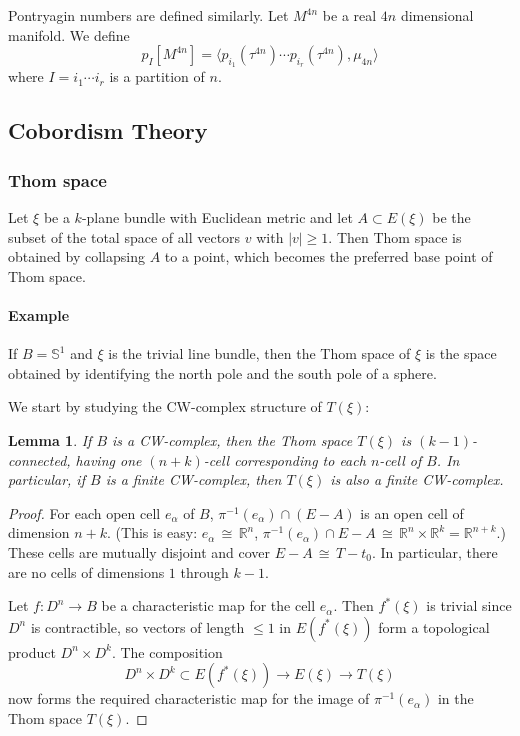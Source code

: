 \documentclass[12pt]{article}
\theoremstyle{plain}
\newtheorem{lemma}[equation]{Lemma}
\theoremstyle{definition}
\newcommand{\IR}{\mathbb{R}}
\newcommand{\IS}{\mathbb{S}}
\newcommand\iso{\,{\cong}\,}
\newcommand{\<}{\langle}
\renewcommand{\>}{\rangle}
\begin{document}
Pontryagin numbers are defined similarly. Let $M^{4n}$ be a real $4n$ dimensional manifold. We define 
$$ p_I[M^{4n}] = \< p_{i_1}(\tau^{4n}) \cdots p_{i_r}(\tau^{4n}), \mu_{4n} \> $$
where $I = i_1 \cdots i_r$ is a partition of $n$. 

\subsection{Cobordism Theory} 
\subsubsection{Thom space}
Let $\xi$ be a $k$-plane bundle with Euclidean metric and let $A \subset E(\xi)$ be the subset of the total space of all vectors $v$ with $|v| \ge 1$. Then Thom space is obtained by collapsing $A$ to a point, which becomes the preferred base point of Thom space. 

\paragraph{Example} If $B = \IS^1$ and $\xi$ is the trivial line bundle, then the Thom space of $\xi$ is the space obtained by identifying the north pole and the south pole of a sphere. 

We start by studying the CW-complex structure of $T(\xi)$: 
\begin{lemma}
If $B$ is a CW-complex, then the Thom space $T(\xi)$ is $(k - 1)$-connected, having one $(n + k)$-cell corresponding to each $n$-cell of $B$. In particular, if $B$ is a finite CW-complex, then $T(\xi)$ is also a finite CW-complex. 
\end{lemma}
\begin{proof}
For each open cell $e_\alpha$ of $B$, $\pi^{-1}(e_\alpha) \cap (E - A)$ is an open cell of dimension $n + k$. (This is easy: $e_\alpha \iso \IR^{n}$, $\pi^{-1}(e_\alpha) \cap E - A \iso \IR^{n} \times \IR^{k} = \IR^{n + k}$.) These cells are mutually disjoint and cover $E - A \iso T - t_0$. In particular, there are no cells of dimensions $1$ through $k - 1$. 

Let $f : D^n \to B$ be a characteristic map for the cell $e_\alpha$. Then $f^*(\xi)$ is trivial since $D^n$ is contractible, so vectors of length $\le 1$ in $E(f^*(\xi))$ form a topological product $D^n \times D^k$. The composition 
$$ D^n \times D^k \subset E(f^*(\xi)) \to E(\xi) \to T(\xi) $$
now forms the required characteristic map for the image of $\pi^{-1}(e_\alpha)$ in the Thom space $T(\xi)$. 
\end{proof}
\end{document}
